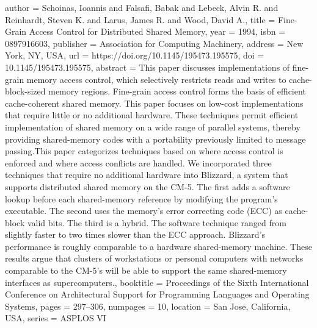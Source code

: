 {{author = {Schoinas, Ioannis and Falsafi, Babak and Lebeck, Alvin R. and Reinhardt, Steven K. and Larus, James R. and Wood, David A.},
title = {Fine-Grain Access Control for Distributed Shared Memory},
year = {1994},
isbn = {0897916603},
publisher = {Association for Computing Machinery},
address = {New York, NY, USA},
url = {https://doi.org/10.1145/195473.195575},
doi = {10.1145/195473.195575},
abstract = {This paper discusses implementations of fine-grain memory access control, which selectively restricts reads and writes to cache-block-sized memory regions. Fine-grain access control forms the basis of efficient cache-coherent shared memory. This paper focuses on low-cost implementations that require little or no additional hardware. These techniques permit efficient implementation of shared memory on a wide range of parallel systems, thereby providing shared-memory codes with a portability previously limited to message passing.This paper categorizes techniques based on where access control is enforced and where access conflicts are handled. We incorporated three techniques that require no additional hardware into Blizzard, a system that supports distributed shared memory on the CM-5. The first adds a software lookup before each shared-memory reference by modifying the program's executable. The second uses the memory's error correcting code (ECC) as cache-block valid bits. The third is a hybrid. The software technique ranged from slightly faster to two times slower than the ECC approach. Blizzard's performance is roughly comparable to a hardware shared-memory machine. These results argue that clusters of workstations or personal computers with networks comparable to the CM-5's will be able to support the same shared-memory interfaces as supercomputers.},
booktitle = {Proceedings of the Sixth International Conference on Architectural Support for Programming Languages and Operating Systems},
pages = {297–306},
numpages = {10},
location = {San Jose, California, USA},
series = {ASPLOS VI}
}


}

